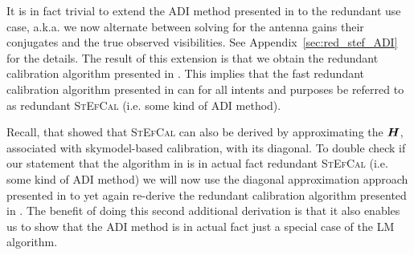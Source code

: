 \documentclass[useAMS,usenatbib]{mn2e}
\newcommand{\bH}{\bmath{H}}
\begin{document}
It is in fact trivial to extend the ADI method presented in \citet{Salvini2014} to the redundant use case, a.k.a. we now alternate between solving for the antenna gains their conjugates and the true observed visibilities.
See Appendix~\ref{sec:red_stef_ADI} for the details. The result of this extension is that we obtain the redundant calibration algorithm presented in \citet{Marthi2014}. This implies that the fast redundant calibration algorithm presented in \citet{Marthi2014} can for all intents and purposes be referred to as redundant \textsc{StEfCal} (i.e. some kind of ADI method).

Recall, that \citet{Smirnov2015} showed that \textsc{StEfCal} can also be derived by approximating the $\bH$, associated with skymodel-based calibration, with 
its diagonal. To double check if our statement that the algorithm in \citet{Marthi2014} is in actual fact redundant \textsc{StEfCal} (i.e. some kind of ADI method) we will now use the diagonal approximation approach presented in \citet{Smirnov2015} to yet again re-derive the redundant calibration algorithm presented in \citet{Marthi2014}.
The benefit of doing this second additional derivation is that it also enables us to show that the ADI method is in actual fact just a special case of the LM algorithm.
\end{document}
